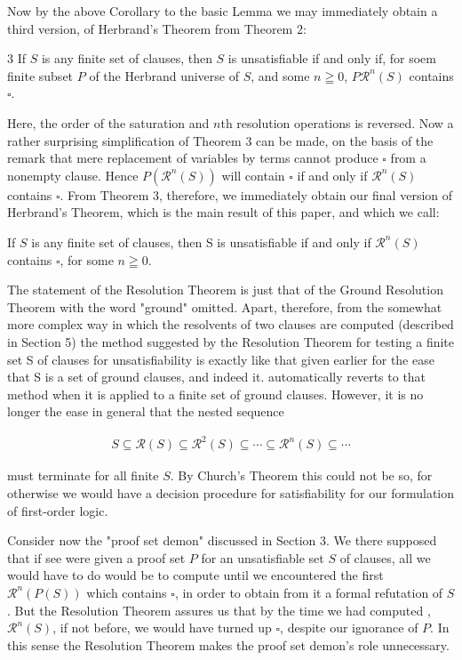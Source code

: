 \documentclass[8pt]{extarticle}
\begin{document}
Now by the above Corollary to the basic Lemma we may immediately obtain
a third version, of Herbrand's Theorem from Theorem 2: 

\begin{pg8theorem3}{3}\label{pg8theorem3}
If $S$ is any finite set of clauses, then $S$ is unsatisfiable if and only if, for soem finite subset $P$ of the Herbrand universe of $S$, and some $n\geqq 0$, $P\mathscr{R}^n(S)$ contains $\square$.
\end{pg8theorem3}

Here, the order of the saturation and $n$th resolution operations is reversed.
Now a rather surprising simplification of Theorem 3 can be made, on the basis
of the remark that mere replacement of variables by terms cannot produce $\square$
from a nonempty clause. Hence $P(\mathscr{R}^n(S))$ will contain $\square$ if and only if $\mathscr{R}^n(S)$
contains $\square$. From Theorem 3, therefore, we immediately obtain our final version
of Herbrand's Theorem, which is the main result of this paper, and which we
call:


\begin{pg8rt}
If $S$ is any finite set of clauses, then S is unsatisfiable
if and only if $\mathscr{R}^n(S)$ contains $\square$, for some $n\geqq 0$. 
\end{pg8rt}

The statement of the Resolution Theorem is just that of the Ground Resolution Theorem with the word "ground" omitted. Apart, therefore, from the somewhat more complex way in which the resolvents of two clauses are computed
(described in Section 5) the method suggested by the Resolution Theorem for
testing a finite set S of clauses for unsatisfiability is exactly like that given earlier for the ease that S is a set of ground clauses, and indeed it. automatically reverts to that method when it is applied to a finite set of ground clauses. However, it is no longer the ease in general that the nested sequence

\begin{align*}
    S \subseteq \mathscr{R}(S) \subseteq \mathscr{R}^2(S) \subseteq \dotsm \subseteq \mathscr{R}^n(S) \subseteq \dotsm
\end{align*}

must terminate for all finite $S$. By Church's Theorem this could not be so, for otherwise we would have a decision procedure for satisfiability for our formulation of first-order logic. 

Consider now the "proof set demon" discussed in Section 3. We there supposed that if see were given a proof set $P$ for an unsatisfiable set $S$ of clauses, all we would have to do would be to compute until we encountered the first $\mathscr{R}^n(P(S))$ which contains $\square$, in order to obtain from it a formal refutation of $S$. But the Resolution Theorem assures us that by the time we had computed ,$\mathscr{R}^n(S)$, if not before, we would have turned up $\square$, despite our ignorance of $P$. In this sense the Resolution Theorem makes the proof set demon's role unnecessary.
\end{document}
